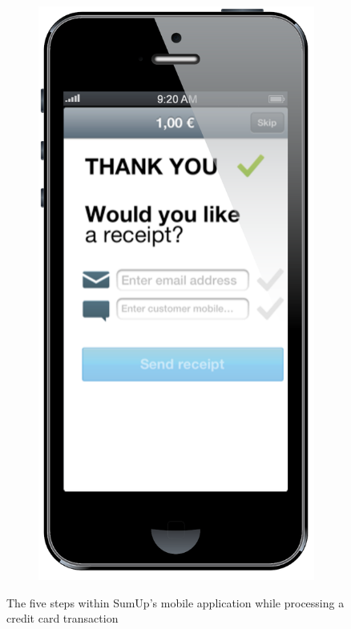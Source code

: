 \documentclass[a4paper, oneside]{csthesis}
\begin{document}
\begin{figure}
\begin{subfigure}[b]{0.16\textwidth}
                \includegraphics[width=\textwidth]{figures/flow6.png}
                \caption{}
                \label{fig:flow6}
        \end{subfigure}
        \caption{The five steps within SumUp's mobile application while processing a credit card transaction}\label{fig:flow-customer}
\end{figure}
\end{document}
